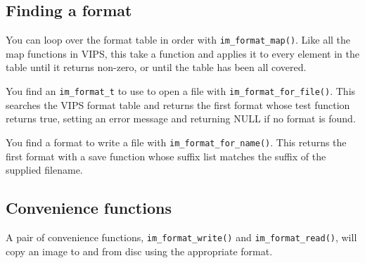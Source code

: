 \subsection{Finding a format}

You can loop over the format table in order with \verb+im_format_map()+. Like
all the map functions in VIPS, this take a function and applies it to every
element in the table until it returns non-zero, or until the table has been
all covered.

You find an \verb+im_format_t+ to use to open a file with
\verb+im_format_for_file()+. This searches the VIPS format table and returns
the first format whose test function returns true, setting an error message
and returning NULL if no format is found.

You find a format to write a file with \verb+im_format_for_name()+. This
returns the first format with a save function whose suffix list matches the
suffix of the supplied filename.

\subsection{Convenience functions}

A pair of convenience functions, \verb+im_format_write()+ and
\verb+im_format_read()+, will copy an image to and from disc using the
appropriate format.

